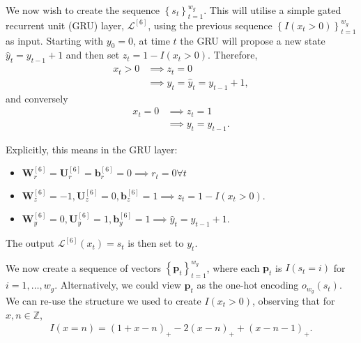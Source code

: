 \documentclass{somasmsc}
\begin{document}
We now wish to create the sequence $\left\{s_t\right\}_{t=1}^{w_g}$. This will utilise a simple gated recurrent unit (GRU) layer, $\mathcal{L}^{\left[6\right]}$, using the previous sequence $\left\{I\left(x_t > 0\right)\right\}_{t=1}^{w_g}$ as input. Starting with $y_0 = 0$, at time $t$ the GRU will propose a new state $\hat{y}_t = y_{t-1} + 1$ and then set $z_t = 1 - I\left(x_t > 0\right)$. Therefore,
\begin{align*}
x_t > 0 &\implies z_t = 0 \\
&\implies y_t = \hat{y}_t = y_{t-1} + 1,
\end{align*}
and conversely
\begin{align*}
x_t = 0 &\implies z_t = 1 \\
&\implies y_t = y_{t-1}.
\end{align*}

Explicitly, this means in the GRU layer:
\begin{itemize}
    \item $\mathbf{W}^{\left[6\right]}_r = \mathbf{U}^{\left[6\right]}_r = \pmb{b}^{\left[6\right]}_r = 0 \implies r_t = 0 \forall t$
    \item $\mathbf{W}^{\left[6\right]}_z = -1, \mathbf{U}^{\left[6\right]}_z = 0, \pmb{b}^{\left[6\right]}_z = 1 \implies z_t = 1 - I\left(x_t > 0\right)$.
    \item $\mathbf{W}^{\left[6\right]}_y = 0, \mathbf{U}^{\left[6\right]}_y = 1, \pmb{b}^{\left[6\right]}_y = 1 \implies \hat{y}_t = y_{t-1} + 1$.
\end{itemize}

The output $\mathcal{L}^{\left[6\right]}\left(x_t\right) = s_t$ is then set to $y_t$.

We now create a sequence of vectors $\left\{\pmb{p}_t\right\}_{t=1}^{w_g}$, where each $\pmb{p}_t$ is $I\left(s_t = i\right)$ for $i = 1, \dots, w_g$. Alternatively, we could view $\pmb{p}_t$ as the one-hot encoding $o_{w_g}\left(s_t\right)$. We can re-use the structure we used to create $I\left(x_t > 0\right)$, observing that for $x,n \in \mathbb{Z}$,
\begin{align*}
I\left(x = n\right) = \left(1 + x - n\right)_+ - 2\left(x - n\right)_+ + \left(x - n - 1\right)_+.
\end{align*}
\end{document}
